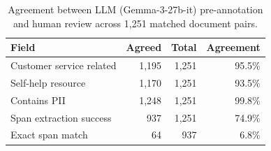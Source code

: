 \begin{table}[t]
\centering
\caption{Agreement between LLM (Gemma-3-27b-it) pre-annotation and human review across 1{,}251 matched document pairs.}
\label{tab:agreement}
\begin{tabular}{lrrr}
\toprule
\textbf{Field} & \textbf{Agreed} & \textbf{Total} & \textbf{Agreement} \\
\midrule
Customer service related & 1{,}195 & 1{,}251 & 95.5\% \\
Self-help resource & 1{,}170 & 1{,}251 & 93.5\% \\
Contains PII & 1{,}248 & 1{,}251 & 99.8\% \\
\midrule
Span extraction success & 937 & 1{,}251 & 74.9\% \\
Exact span match & 64 & 937 & 6.8\% \\
\bottomrule
\end{tabular}
\end{table}
